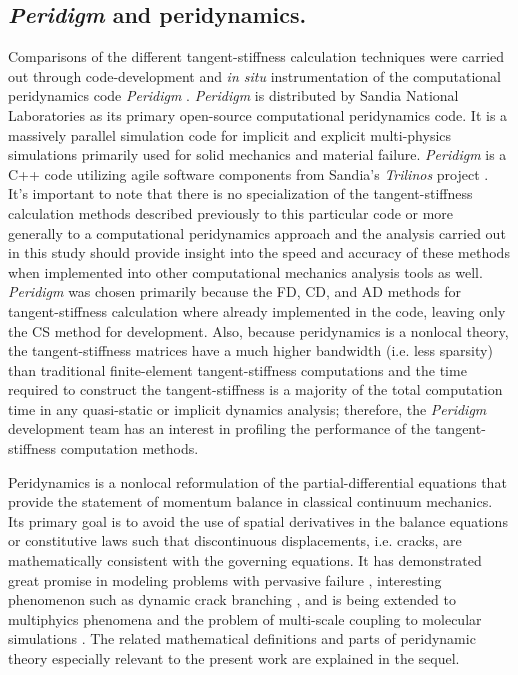 \documentclass[preprint,12pt]{elsarticle}
\begin{document}
\subsection{\emph{Peridigm} and peridynamics.}
%
Comparisons of the different tangent-stiffness calculation techniques were
carried out through code-development and \emph{in situ} instrumentation of the
computational peridynamics code \emph{Peridigm} \cite{peridigm}.
\emph{Peridigm} is distributed by Sandia National Laboratories as its primary
open-source computational peridynamics code. It is a massively parallel
simulation code for implicit and explicit multi-physics simulations primarily
used for solid mechanics and material failure. \emph{Peridigm} is a C++ code
utilizing agile software components from Sandia's  \emph{Trilinos} project
\cite{trilinos}. It's important to note that there is no specialization of the
tangent-stiffness calculation methods described previously to this particular
code or more generally to a computational peridynamics approach and the
analysis carried out in this study should provide insight into the speed and
accuracy of these methods when implemented into other computational mechanics
analysis tools as well.  \emph{Peridigm} was chosen primarily because the FD,
CD, and AD methods for tangent-stiffness calculation where already implemented
in the code, leaving only the CS method for development. Also, because
peridynamics is a nonlocal theory, the tangent-stiffness matrices have a much
higher bandwidth (i.e. less sparsity) than traditional finite-element
tangent-stiffness computations and the time required to construct the
tangent-stiffness is a majority of the total computation time in any
quasi-static or implicit dynamics analysis; therefore, the \emph{Peridigm}
development team has an interest in profiling the performance of the
tangent-stiffness computation methods.

Peridynamics \cite{silling2000ret,silling:psa,silling2010peridynamic}
is a nonlocal reformulation of the partial-differential equations that provide
the statement of momentum balance in classical continuum mechanics. Its primary
goal is to avoid the use of spatial derivatives in the balance equations or
constitutive laws such that discontinuous displacements, i.e. cracks, are
mathematically consistent with the governing equations. It has demonstrated
great promise in modeling problems with pervasive failure
\cite{littlewood2010}, interesting phenomenon such as dynamic crack branching
\cite{ha2010sod}, and is being extended to multiphyics phenomena
\cite{bobaru2011peridynamic,katiyar2013} and the problem of multi-scale
coupling to molecular simulations \cite{seleson2009peridynamics}. The related mathematical
definitions and parts of peridynamic theory especially relevant to the present
work are explained in the sequel. 
\end{document}
